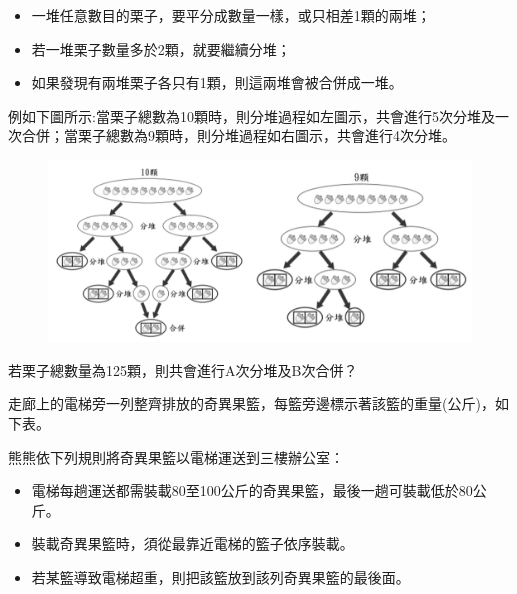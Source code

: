 \documentclass[a4paper, 12pt, addpoints]{exam}
\begin{document}
\begin{questions}
    \begin{itemize}
        \item 一堆任意數目的栗子，要平分成數量一樣，或只相差1顆的兩堆；
        \item 若一堆栗子數量多於2顆，就要繼續分堆；
        \item 如果發現有兩堆栗子各只有1顆，則這兩堆會被合併成一堆。
    \end{itemize}

    例如下圖所示:當栗子總數為10顆時，則分堆過程如左圖示，共會進行5次分堆及一次合併；當栗子總數為9顆時，則分堆過程如右圖示，共會進行4次分堆。
    \begin{figure}[H]
        \centerline{\includegraphics[width=\textwidth]{fig/sq.png}}
    \end{figure}

    若栗子總數量為125顆，則共會進行A次分堆及B次合併？


    \question[4]
    走廊上的電梯旁一列整齊排放的奇異果籃，每籃旁邊標示著該籃的重量(公斤)，如下表。

    \begin{table}[H]
        \centering
    \end{table}
    熊熊依下列規則將奇異果籃以電梯運送到三樓辦公室：

    \begin{itemize}
        \item 電梯每趟運送都需裝載80至100公斤的奇異果籃，最後一趟可裝載低於80公斤。
        \item 裝載奇異果籃時，須從最靠近電梯的籃子依序裝載。
        \item 若某籃導致電梯超重，則把該籃放到該列奇異果籃的最後面。
    \end{itemize}


\end{questions}
\end{document}

